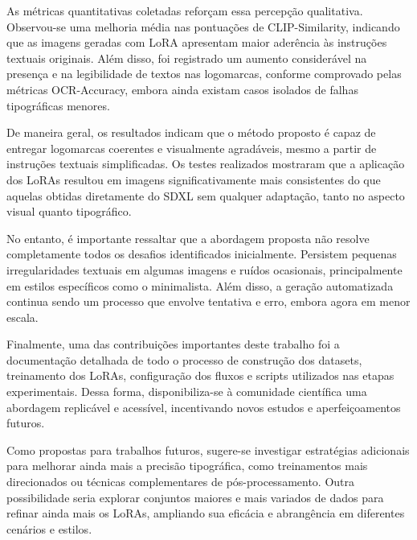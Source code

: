\documentclass[12pt, %
openright, 
oneside, %
a4paper,    %
brazil]{facom-ufu-abntex2}
\begin{document}
As métricas quantitativas coletadas reforçam essa percepção qualitativa. Observou-se uma melhoria média nas pontuações de CLIP-Similarity, indicando que as imagens geradas com LoRA apresentam maior aderência às instruções textuais originais. Além disso, foi registrado um aumento considerável na presença e na legibilidade de textos nas logomarcas, conforme comprovado pelas métricas OCR-Accuracy, embora ainda existam casos isolados de falhas tipográficas menores.

De maneira geral, os resultados indicam que o método proposto é capaz de entregar logomarcas coerentes e visualmente agradáveis, mesmo a partir de instruções textuais simplificadas. Os testes realizados mostraram que a aplicação dos LoRAs resultou em imagens significativamente mais consistentes do que aquelas obtidas diretamente do SDXL sem qualquer adaptação, tanto no aspecto visual quanto tipográfico.

No entanto, é importante ressaltar que a abordagem proposta não resolve completamente todos os desafios identificados inicialmente. Persistem pequenas irregularidades textuais em algumas imagens e ruídos ocasionais, principalmente em estilos específicos como o minimalista. Além disso, a geração automatizada continua sendo um processo que envolve tentativa e erro, embora agora em menor escala.

Finalmente, uma das contribuições importantes deste trabalho foi a documentação detalhada de todo o processo de construção dos datasets, treinamento dos LoRAs, configuração dos fluxos e scripts utilizados nas etapas experimentais. Dessa forma, disponibiliza-se à comunidade científica uma abordagem replicável e acessível, incentivando novos estudos e aperfeiçoamentos futuros.

Como propostas para trabalhos futuros, sugere-se investigar estratégias adicionais para melhorar ainda mais a precisão tipográfica, como treinamentos mais direcionados ou técnicas complementares de pós-processamento. Outra possibilidade seria explorar conjuntos maiores e mais variados de dados para refinar ainda mais os LoRAs, ampliando sua eficácia e abrangência em diferentes cenários e estilos.



\postextual



\end{document}
